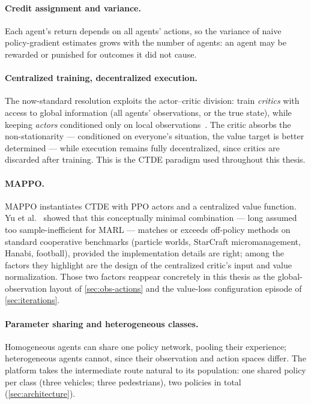 \paragraph{Credit assignment and variance.}
Each agent's return depends on all agents' actions, so the variance of
naive policy-gradient estimates grows with the number of agents: an
agent may be rewarded or punished for outcomes it did not cause.

\paragraph{Centralized training, decentralized execution.}
The now-standard resolution exploits the actor--critic division: train
\emph{critics} with access to global information (all agents'
observations, or the true state), while keeping \emph{actors}
conditioned only on local observations~\cite{lowe2017maddpg}. The critic
absorbs the non-stationarity --- conditioned on everyone's situation, the
value target is better determined --- while execution remains fully
decentralized, since critics are discarded after training. This is the
CTDE paradigm used throughout this thesis.

\paragraph{MAPPO.}
MAPPO instantiates CTDE with PPO actors and a centralized value
function. Yu et al.~\cite{yu2022surprising} showed that this
conceptually minimal combination --- long assumed too sample-inefficient
for MARL --- matches or exceeds off-policy methods on standard
cooperative benchmarks (particle worlds, StarCraft micromanagement,
Hanabi, football), provided the implementation details are right; among
the factors they highlight are the design of the centralized critic's
input and value normalization. Those two factors reappear concretely in
this thesis as the global-observation layout of \cref{sec:obs-actions}
and the value-loss configuration episode of \cref{sec:iterations}.

\paragraph{Parameter sharing and heterogeneous classes.}
Homogeneous agents can share one policy network, pooling their
experience; heterogeneous agents cannot, since their observation and
action spaces differ. The platform takes the intermediate route natural
to its population: one shared policy per class (three vehicles; three
pedestrians), two policies in total (\cref{sec:architecture}).

